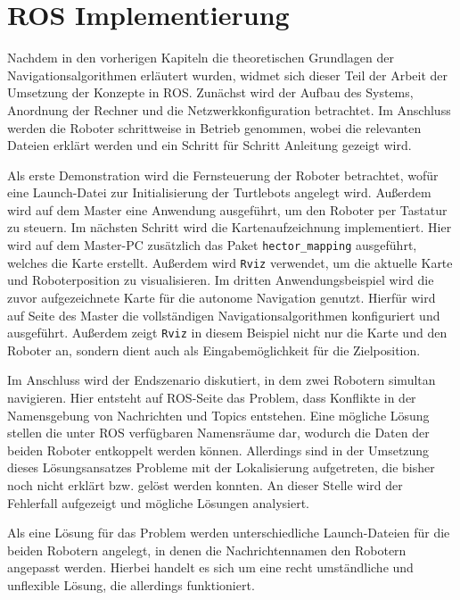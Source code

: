 \chapter{ROS Implementierung}
Nachdem in den vorherigen Kapiteln die theoretischen Grundlagen der Navigationsalgorithmen erläutert wurden, widmet sich dieser Teil der Arbeit der Umsetzung der Konzepte in ROS. Zunächst wird der Aufbau des Systems, Anordnung der Rechner und die Netzwerkkonfiguration betrachtet. Im Anschluss werden die Roboter schrittweise in Betrieb genommen, wobei die relevanten Dateien erklärt werden und  ein Schritt für Schritt Anleitung gezeigt wird.

Als erste Demonstration wird die Fernsteuerung der Roboter betrachtet, wofür eine Launch-Datei zur Initialisierung der Turtlebots angelegt wird. Außerdem wird auf dem Master eine Anwendung ausgeführt, um den Roboter per Tastatur zu steuern.
Im nächsten Schritt wird die Kartenaufzeichnung implementiert. Hier wird auf dem Master-PC zusätzlich das Paket \lstinline{hector_mapping}{} ausgeführt, welches die Karte erstellt. Außerdem wird \lstinline{Rviz}{} verwendet, um die aktuelle Karte und Roboterposition zu visualisieren.
Im dritten Anwendungsbeispiel wird die zuvor aufgezeichnete Karte für die autonome Navigation genutzt. Hierfür wird auf Seite des Master die vollständigen Navigationsalgorithmen konfiguriert und ausgeführt. Außerdem zeigt \lstinline{Rviz}{} in diesem Beispiel nicht nur die Karte und den Roboter an, sondern dient auch als Eingabemöglichkeit für die Zielposition.

Im Anschluss wird der Endszenario diskutiert, in dem zwei Robotern simultan navigieren. Hier entsteht auf ROS-Seite das Problem, dass Konflikte in der Namensgebung von Nachrichten und Topics entstehen. Eine mögliche Lösung stellen die unter ROS verfügbaren Namensräume dar, wodurch die Daten der beiden Roboter entkoppelt werden können. Allerdings sind in der Umsetzung dieses Lösungsansatzes Probleme mit der Lokalisierung aufgetreten, die bisher noch nicht erklärt bzw. gelöst werden konnten. An dieser Stelle wird der Fehlerfall aufgezeigt und mögliche Lösungen analysiert.

Als eine Lösung für das Problem werden unterschiedliche Launch-Dateien für die beiden Robotern angelegt, in denen die Nachrichtennamen den Robotern angepasst werden. Hierbei handelt es sich um eine recht umständliche und unflexible Lösung, die allerdings funktioniert. 

\newpage


\newpage
